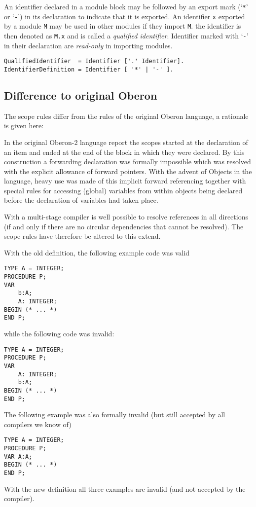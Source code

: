 \documentclass[a4wide,11pt]{article}
\begin{document}
An identifier declared in a module block may be followed by an export mark (`\verb~*~' or `\verb~-~') in its declaration to indicate that it is exported.
An identifier \verb~x~ exported by a module \verb~M~ may be used in other modules if they import \verb~M~.
the identifier is then denoted as \verb~M.x~ and is called a \emph{qualified identifier}.
Identifier marked with  `\verb~-~' in their declaration are \emph{read-only} in importing modules.

\begin{lstlisting}[style = ebnf]
QualifiedIdentifier  = Identifier ['.' Identifier].
IdentifierDefinition = Identifier [ '*' | '-' ].
\end{lstlisting}


\begin{annotation}
\subsection{Difference to original Oberon}\label{rationale:scopes}
The scope rules differ from the rules of the original Oberon language, a rationale is given here:

In the original Oberon-2 language report the scopes started at the declaration of an item and ended at the end of the block in which they were declared.
By this construction a forwarding declaration was formally impossible which was resolved with the explicit allowance of forward pointers.
With the advent of Objects in the language, heavy use was made of this implicit forward referencing together with special rules for accessing (global) variables from within objects being declared before the declaration of variables had taken place.

With a multi-stage compiler is well possible to resolve references in all directions (if and only if there are no circular dependencies that cannot be resolved).
The scope rules have therefore be altered to this extend.

With the old definition, the following example code was valid
\begin{lstlisting}[style=example]
TYPE A = INTEGER;
PROCEDURE P;
VAR
    b:A;
    A: INTEGER;
BEGIN (* ... *)
END P;
\end{lstlisting}
while the following code was invalid:
\begin{lstlisting}[style=example]
TYPE A = INTEGER;
PROCEDURE P;
VAR
    A: INTEGER;
    b:A;
BEGIN (* ... *)
END P;
\end{lstlisting}

The following example was also formally invalid (but still accepted by all compilers we know of)
\begin{lstlisting}[style=example]
TYPE A = INTEGER;
PROCEDURE P;
VAR A:A;
BEGIN (* ... *)
END P;
\end{lstlisting}

With the new definition all three examples are invalid (and not accepted by the compiler).

\end{annotation}
\end{document}
